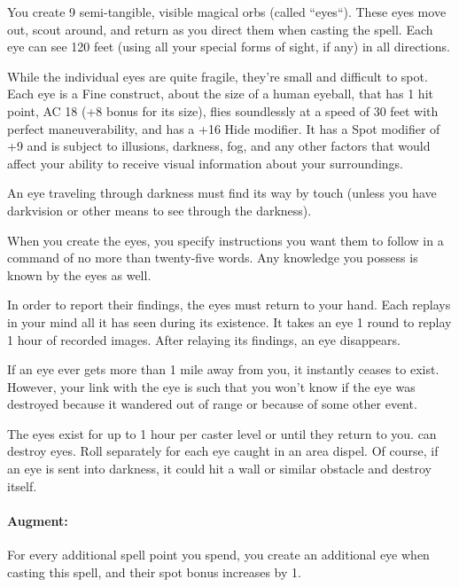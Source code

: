 You create 9 semi-tangible, visible magical orbs (called ``eyes``).
These eyes move out, scout around, and return as you direct them when casting the spell. 
Each eye can see 120 feet (using all your special forms of sight, if any) in all directions.

While the individual eyes are quite fragile, they're small and difficult to spot. 
Each eye is a Fine construct, about the size of a human eyeball, that has 1 hit point, AC 18 (+8 bonus for its size), 
flies soundlessly at a speed of 30 feet with perfect maneuverability, and has a +16 Hide modifier. 
It has a Spot modifier of +9 and is subject to illusions, 
darkness, fog, and any other factors that would affect your ability to receive visual information about your surroundings. 

An eye traveling through darkness must find its way by touch (unless you have darkvision or other means to see through the darkness).

When you create the eyes, you specify instructions you want them to follow in a command of no more than twenty-five words. 
Any knowledge you possess is known by the eyes as well.

In order to report their findings, the eyes must return to your hand. Each replays in your mind all it has seen during its existence. 
It takes an eye 1 round to replay 1 hour of recorded images. After relaying its findings, an eye disappears.

If an eye ever gets more than 1 mile away from you, it instantly ceases to exist. 
However, your link with the eye is such that you won't know if the eye was destroyed because it wandered out of range or because of some other event.

The eyes exist for up to 1 hour per caster level or until they return to you. 
 can destroy eyes. Roll separately for each eye caught in an area dispel. 
Of course, if an eye is sent into darkness, it could hit a wall or similar obstacle and destroy itself.

\paragraph{Augment:} For every additional spell point you spend, you create an additional eye when casting this spell, and their spot bonus increases by 1.

